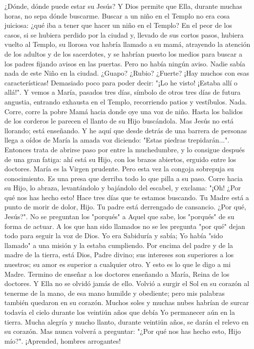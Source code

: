 \documentclass[12pt]{book} %
\begin{document}
¿Dónde, dónde puede estar su Jesús? Y Dios permite que Ella, durante muchas horas, no sepa dónde buscarme. Buscar a un niño en el Templo no era cosa juiciosa: ¿qué iba a tener que hacer un niño en el Templo? En el peor de los casos, si se hubiera perdido por la ciudad y, llevado de sus cortos pasos, hubiera vuelto al Templo, su llorosa voz habría llamado a su mamá, atrayendo la atención de los adultos y de los sacerdotes, y se habrían puesto los medios para buscar a los padres fijando avisos en las puertas. Pero no había ningún aviso. 
 Nadie sabía nada de este Niño en la ciudad. ¿Guapo? ¿Rubio? ¿Fuerte? ¡Hay muchos con esas características! 
Demasiado poco para poder decir: "¡Lo he visto! ¡Estaba allí o allá!".         
Y vemos a María, pasados tres días, símbolo de otros tres días de futura angustia, entrando exhausta en el Templo, recorriendo patios y vestíbulos. Nada. Corre, corre la pobre Mamá hacia donde oye una voz de niño. Hasta los balidos de los corderos le parecen el llanto de su Hijo buscándola. Mas Jesús no está llorando; está enseñando. Y he aquí que desde detrás de una barrera de personas llega a oídos de María la amada voz diciendo: "Estas piedras trepidarán...". Entonces trata de abrirse paso por entre la muchedumbre, y lo consigue después de una gran fatiga: ahí está su Hijo, con los brazos abiertos, erguido entre los doctores. 
María es la Virgen prudente. Pero esta vez la congoja sobrepuja su conocimiento. Es una presa que derriba todo lo que 
pilla a su paso. Corre hacia su Hijo, lo abraza, levantándolo y bajándolo del escabel, y exclama: "¡Oh! ¿Por qué nos has hecho esto! Hace tres días que te estamos buscando. Tu Madre está a punto de morir de dolor, Hijo. Tu padre está derrengado de cansancio. ¿Por qué, Jesús?". 
No se preguntan los "porqués" a Aquel que sabe, los "porqués" de su forma de actuar. A los que han sido llamados no 
se les pregunta "por qué" dejan todo para seguir la voz de Dios. Yo era Sabiduría y sabía; Yo había "sido llamado" a una misión y la estaba cumpliendo. Por encima del padre y de la madre de la tierra, está Dios, Padre divino; sus intereses son superiores a los nuestros; su amor es superior a cualquier otro. Y esto es lo que le digo a mi Madre. 
Termino de enseñar a los doctores enseñando a María, Reina de los doctores. Y Ella no se olvidó jamás de ello. Volvió a surgir el Sol en su corazón al tenerme de la mano, de esa mano humilde y obediente; pero mis palabras también quedaron en su corazón. Muchos soles y muchas nubes habrían de surcar todavía el cielo durante los veintiún años que debía Yo permanecer aún en la tierra. Mucha alegría y mucho llanto, durante veintiún años, se darán el relevo en su corazón. Mas nunca volverá a preguntar: "¿Por qué nos has hecho esto, Hijo mío?". ¡Aprended, hombres arrogantes! 
 
\end{document}
